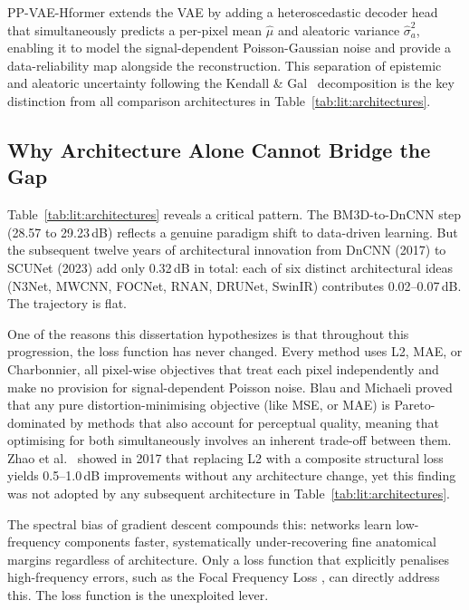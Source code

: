 \documentclass[12pt, a4paper, twoside, openright]{book}
\begin{document}
PP-VAE-Hformer extends the VAE by adding a heteroscedastic decoder head that simultaneously predicts a per-pixel mean $\hat{\mu}$ and aleatoric variance $\hat{\sigma}^2_a$, enabling it to model the signal-dependent Poisson-Gaussian noise and provide a data-reliability map alongside the reconstruction. This separation of epistemic and aleatoric uncertainty following the Kendall \& Gal~\cite{kendall_what_2017} decomposition is the key distinction from all comparison architectures in Table~\ref{tab:lit:architectures}.

\subsection{Why Architecture Alone Cannot Bridge the Gap}
\label{sec:lit:architectures:plateau}

Table~\ref{tab:lit:architectures} reveals a critical pattern. The BM3D-to-DnCNN step (28.57 to 29.23\,dB) reflects a genuine paradigm shift to data-driven learning. But the subsequent twelve years of architectural innovation from DnCNN (2017) to SCUNet (2023) add only 0.32\,dB in total: each of six distinct architectural ideas (N3Net, MWCNN, FOCNet, RNAN, DRUNet, SwinIR) contributes 0.02--0.07\,dB. The trajectory is flat.

One of the reasons this dissertation hypothesizes is that throughout this progression, the loss function has never changed. Every method uses L2, MAE, or Charbonnier, all pixel-wise objectives that treat each pixel independently and make no provision for signal-dependent Poisson noise. Blau and Michaeli \cite{blau_perception_2018} proved that any pure distortion-minimising objective (like MSE, or MAE) is Pareto-dominated by methods that also account for perceptual quality, meaning that optimising for both simultaneously involves an inherent trade-off between them. Zhao et al.\ \cite{zhao_loss_2017} showed in 2017 that replacing L2 with a composite structural loss yields 0.5--1.0\,dB improvements without any architecture change, yet this finding was not adopted by any subsequent architecture in Table~\ref{tab:lit:architectures}.

The spectral bias of gradient descent \cite{rahaman_spectral_2019} compounds this: networks learn low-frequency components faster, systematically under-recovering fine anatomical margins regardless of architecture. Only a loss function that explicitly penalises high-frequency errors, such as the Focal Frequency Loss \cite{jiang_focal_2021}, can directly address this. The loss function is the unexploited lever.
\end{document}
